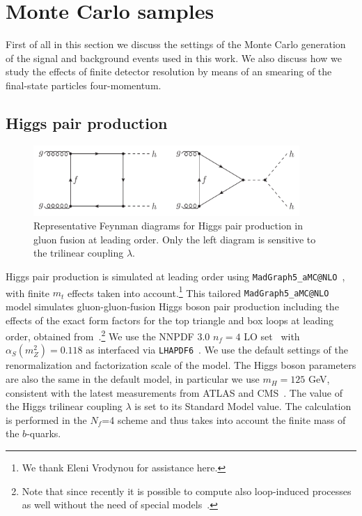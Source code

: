 \section{Monte Carlo samples}
\label{mcgeneration}

First of all in this section we discuss the settings of the
Monte Carlo generation of the signal and background
events used in this work.
%
We also discuss how we study the effects of finite detector
resolution by means of an smearing of the final-state
particles four-momentum.

\subsection{Higgs pair production}


\begin{figure}[t]
\begin{center}
  \includegraphics[width=0.90\textwidth]{plots/hhFeyn.pdf}
  \caption{\small Representative Feynman diagrams
    for Higgs pair production in gluon fusion at
    leading order.
    Only the left diagram is sensitive to the trilinear coupling
    $\lambda$.
}
\label{fig:hhFeyn}
\end{center}
\end{figure}

Higgs pair production is simulated at leading order using
{\tt MadGraph5\_aMC@NLO}~\cite{Alwall:2014hca}, with finite $m_t$ effects taken into
account.\footnote{We thank Eleni Vrodynou for assistance here.}
%
This tailored {\tt MadGraph5\_aMC@NLO} model  simulates
gluon-gluon-fusion Higgs boson pair production including the effects
of the
exact form factors for the top triangle and box loops at leading
order, obtained from~\cite{Plehn:1996wb}.\footnote{Note that since recently it is possible to compute also
loop-induced processes as well without the need of special
models~\cite{Hirschi:2015iia}.}
%
We use the NNPDF 3.0 $n_f = 4$ LO set~\cite{Ball:2014uwa} with
$\alpha_S(m_Z^2)=0.118$
as interfaced via {\tt LHAPDF6}~\cite{Buckley:2014ana}.
%
We use the default settings of the renormalization and factorization
scale of the model.
%
The Higgs boson parameters are also the same in the default model,
in particular we use $m_H=125$ GeV, consistent with the latest
measurements from ATLAS and CMS~\cite{Aad:2014aba,Khachatryan:2014jba}.
%
The value of the Higgs trilinear coupling $\lambda$ is set to its
Standard Model value.
%
The calculation is performed in the
$N_f$=4 scheme and thus
takes into account the finite mass of the $b$-quarks.

